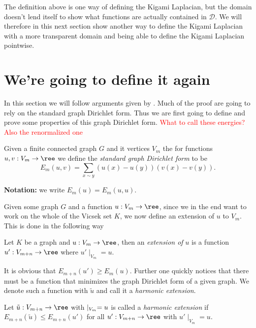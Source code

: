 The definition above is one way of defining the Kigami Laplacian, but the domain doesn't lend itself to show what functions are actually contained in $\mathcal{D}$. We will therefore in this next section show another way to define the Kigami Laplacian with a more transparent domain and being able to define the Kigami Laplacian pointwise.

\section{We're going to define it again}
In this section we will follow arguments given by \cite{strichartz}. Much of the proof are going to rely on the standard graph Dirichlet form. Thus we are first going to define and prove some properties of this graph Dirichlet form. \textcolor{red}{What to call these energies? Also the renormalized one}

\begin{defi}
	Given a finite connected graph $G$ and it vertices $V_m$ the for functions $u, v: V_m \to \ree$ we define the \emph{standard graph Dirichlet form} to be
	\begin{equation}\label{graphEnergy}
		E_m(u,v) = \sum_{x \sim y} \left(u(x) - u(y) \right)(v(x)-v(y)).
	\end{equation}
\end{defi}
\noindent \textbf{Notation: } we write $E_m(u) = E_m(u,u)$.

Given some graph $G$ and a function $u: V_m \to \ree$, since we in the end want to work on the whole of the Vicsek set $K$, we now define an extension of $u$ to $V_m$. This is done in the following way

\begin{defi}
	Let $K$ be a graph and $u: V_m \to \ree$, then an \emph{extension of} $u$ is a function \nl $u': V_{m+n} \to \ree$ where $u' \mid_{V_m} = u$.
\end{defi}

It is obvious that $E_{m+n}(u') \geq E_m(u)$. Further one quickly notices that there must be a function that minimizes the graph Dirichlet form of a given graph. We denote such a function with $\tilde{u}$ and call it a \emph{harmonic extension}.

\begin{defi}
	Let $\tilde{u}: V_{m+n} \to \ree$ with $\title{u} \mid_{V_m} = u$ is called a \emph{harmonic extension} if $E_{m+n}(\tilde{u}) \leq E_{m+n}(u')$ for all $u': V_{m+n} \to \ree$ with $u' \mid _{V_m} = u$.
\end{defi}

